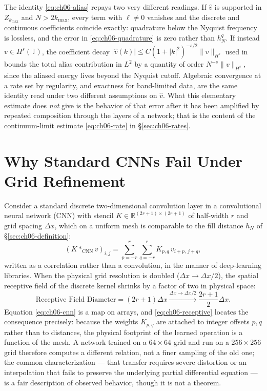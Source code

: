 The identity \eqref{eq:ch06-alias} repays two very different readings. If $\hat v$ is supported in
$Z_{k_{\max}}$ and $N>2k_{\max}$, every term with $\ell\neq0$ vanishes and the
discrete and continuous coefficients coincide exactly: quadrature below the
Nyquist frequency is lossless, and the error in
\eqref{eq:ch06-quadrature} is zero rather than $h_N^q$. If instead $v\in
H^s(\mathbb{T})$, the coefficient decay
$|\hat v(k)| \le C(1+|k|^2)^{-s/2}\|v\|_{H^s}$ used in
 bounds the total
alias contribution in $L^2$ by a quantity of order $N^{-s}\|v\|_{H^s}$, since
the aliased energy lives beyond the Nyquist cutoff. Algebraic convergence at a rate
set by regularity, and exactness for band-limited data, are the same identity
read under two different assumptions on $\hat v$. What this elementary estimate
does \emph{not} give is the behavior of that error after it has been amplified
by repeated composition through the layers of a network; that is the content of
the continuum-limit estimate \eqref{eq:ch06-rate} in \S\ref{sec:ch06-rates}.

\section{Why Standard CNNs Fail Under Grid Refinement}
\label{sec:ch06-cnn}

Consider a standard discrete two-dimensional convolution layer in a
convolutional neural network (CNN) with stencil
$K \in \mathbb{R}^{(2r+1) \times (2r+1)}$ of half-width $r$ and grid spacing
$\Delta x$, which on a uniform mesh is comparable to the fill distance $h_N$ of
\S\ref{sec:ch06-definition}:
\begin{equation}
  \label{eq:ch06-cnn}
  (K *_{\text{CNN}} v)_{i, j} = \sum_{p=-r}^r \sum_{q=-r}^r K_{p, q} \, v_{i+p, \, j+q},
\end{equation}
written as a correlation rather than a convolution, in the manner of
deep-learning libraries.
When the physical grid resolution is doubled ($\Delta x \to \Delta x / 2$), the
spatial receptive field of the discrete kernel shrinks by a factor of two in
physical space:
\begin{equation}
  \label{eq:ch06-receptive}
  \text{Receptive Field Diameter} = (2r+1) \Delta x \xrightarrow{\Delta x \to \Delta x / 2} \frac{2r+1}{2} \Delta x .
\end{equation}
Equation \eqref{eq:ch06-cnn} is a map on arrays, and \eqref{eq:ch06-receptive}
locates the consequence precisely: because the weights $K_{p,q}$ are attached to
integer offsets $p,q$ rather than to distances, the physical footprint of the
learned operation is a function of the mesh. A network trained on a
$64\times64$ grid and run on a $256\times256$ grid therefore computes a
different relation, not a finer sampling of the old one; the common
characterization --- that transfer requires severe distortion or an
interpolation that fails to preserve the underlying partial differential
equation --- is a fair description of observed behavior, though it is not a
theorem.

